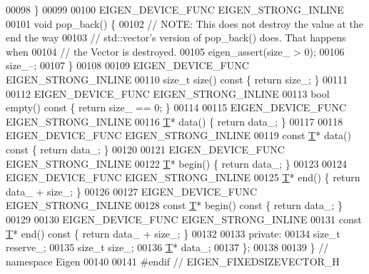 \begin{DoxyCode}
00098   \}
00099 
00100   EIGEN\_DEVICE\_FUNC EIGEN\_STRONG\_INLINE
00101   \textcolor{keywordtype}{void} pop\_back() \{
00102     \textcolor{comment}{// NOTE: This does not destroy the value at the end the way}
00103     \textcolor{comment}{// std::vector's version of pop\_back() does.  That happens when}
00104     \textcolor{comment}{// the Vector is destroyed.}
00105     eigen\_assert(size\_ > 0);
00106     size\_--;
00107   \}
00108 
00109   EIGEN\_DEVICE\_FUNC EIGEN\_STRONG\_INLINE
00110   \textcolor{keywordtype}{size\_t} size()\textcolor{keyword}{ const }\{ \textcolor{keywordflow}{return} size\_; \}
00111 
00112   EIGEN\_DEVICE\_FUNC EIGEN\_STRONG\_INLINE
00113   \textcolor{keywordtype}{bool} empty()\textcolor{keyword}{ const }\{ \textcolor{keywordflow}{return} size\_ == 0; \}
00114 
00115   EIGEN\_DEVICE\_FUNC EIGEN\_STRONG\_INLINE
00116   \hyperlink{group___sparse_core___module}{T}* data() \{ \textcolor{keywordflow}{return} data\_; \}
00117 
00118   EIGEN\_DEVICE\_FUNC EIGEN\_STRONG\_INLINE
00119   \textcolor{keyword}{const} \hyperlink{group___sparse_core___module}{T}* data()\textcolor{keyword}{ const }\{ \textcolor{keywordflow}{return} data\_; \}
00120 
00121   EIGEN\_DEVICE\_FUNC EIGEN\_STRONG\_INLINE
00122   \hyperlink{group___sparse_core___module}{T}* begin() \{ \textcolor{keywordflow}{return} data\_; \}
00123 
00124   EIGEN\_DEVICE\_FUNC EIGEN\_STRONG\_INLINE
00125   \hyperlink{group___sparse_core___module}{T}* end() \{ \textcolor{keywordflow}{return} data\_ + size\_; \}
00126 
00127   EIGEN\_DEVICE\_FUNC EIGEN\_STRONG\_INLINE
00128   \textcolor{keyword}{const} \hyperlink{group___sparse_core___module}{T}* begin()\textcolor{keyword}{ const }\{ \textcolor{keywordflow}{return} data\_; \}
00129 
00130   EIGEN\_DEVICE\_FUNC EIGEN\_STRONG\_INLINE
00131   \textcolor{keyword}{const} \hyperlink{group___sparse_core___module}{T}* end()\textcolor{keyword}{ const }\{ \textcolor{keywordflow}{return} data\_ + size\_; \}
00132 
00133  \textcolor{keyword}{private}:
00134   \textcolor{keywordtype}{size\_t} reserve\_;
00135   \textcolor{keywordtype}{size\_t} size\_;
00136   \hyperlink{group___sparse_core___module}{T}* data\_;
00137 \};
00138 
00139 \}  \textcolor{comment}{// namespace Eigen}
00140 
00141 \textcolor{preprocessor}{#endif  // EIGEN\_FIXEDSIZEVECTOR\_H}
\end{DoxyCode}
